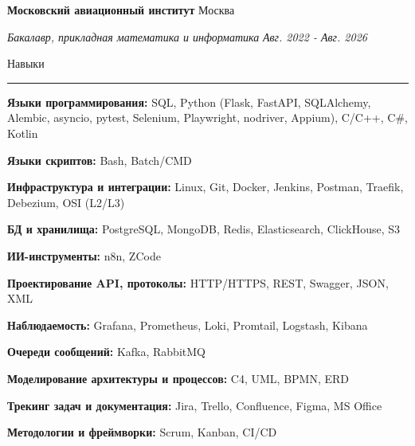\documentclass[14pt, a4paper, oneside]{extarticle}
\begin{document}

\begin{flushleft}
	\vspace{-0.8\intextsep}
	\quad
	\textbf{Московский авиационный институт}
	\hfill
	Москва
\end{flushleft}

\begin{flushleft}
	\vspace{-\intextsep}
	\quad
	\textit{Бакалавр, прикладная математика и информатика}
	\hfill
	\textit{\small Авг. 2022 - Авг. 2026}
\end{flushleft}


\pagebreak


\begin{flushleft}
	\vspace{-\intextsep}
	\large Навыки
\end{flushleft}

\vspace{-0.8\intextsep}
\hrule


\vspace{0.5\intextsep}

\textbf{Языки программирования:} SQL, Python (Flask, FastAPI, SQLAlchemy, Alembic, asyncio, pytest, Selenium,
Playwright, nodriver, Appium), C\slash C++, C\#, Kotlin

\textbf{Языки скриптов:} Bash, Batch/CMD

\textbf{Инфраструктура и интеграции:} Linux, Git, Docker, Jenkins, Postman, Traefik, Debezium, OSI (L2/L3)

\textbf{БД и хранилища:} PostgreSQL, MongoDB, Redis, Elasticsearch, ClickHouse, S3

\textbf{ИИ-инструменты:} n8n, ZCode 

\textbf{Проектирование API, протоколы:} HTTP/HTTPS, REST, Swagger, JSON, XML

\textbf{Наблюдаемость:} Grafana, Prometheus, Loki, Promtail, Logstash, Kibana

\textbf{Очереди сообщений:} Kafka, RabbitMQ

\textbf{Моделирование архитектуры и процессов:} C4, UML, BPMN, ERD

\textbf{Трекинг задач и документация:} Jira, Trello, Confluence, Figma, MS Office

\textbf{Методологии и фреймворки:} Scrum, Kanban, CI/CD
\end{document}

